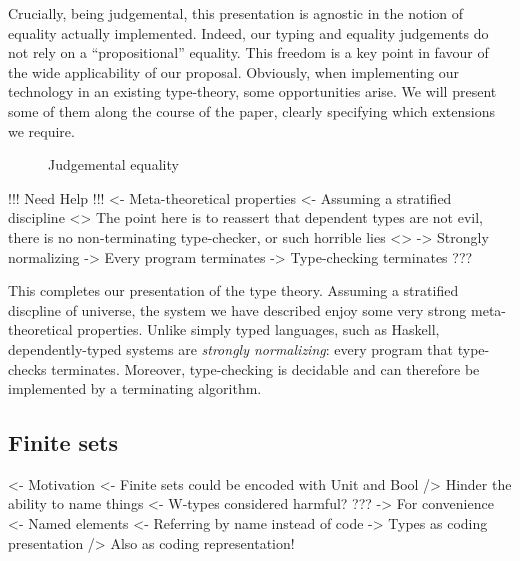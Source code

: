 Crucially, being judgemental, this presentation is agnostic in the
notion of equality actually implemented. Indeed, our typing and
equality judgements do not rely on a ``propositional'' equality. This
freedom is a key point in favour of the wide applicability of our
proposal. Obviously, when implementing our technology in an existing
type-theory, some opportunities arise. We will present some of them
along the course of the paper, clearly specifying which extensions we
require.

\begin{figure}



\caption{Judgemental equality}
\label{fig:judgemental-equality}

\end{figure}



\begin{wstructure}
!!! Need Help !!!
<- Meta-theoretical properties
    <- Assuming a stratified discipline
    <> The point here is to reassert that dependent types are not evil, 
       there is no non-terminating type-checker, or such horrible lies <>
    -> Strongly normalizing
        -> Every program terminates
    -> Type-checking terminates
    ???
\end{wstructure}

This completes our presentation of the type theory. Assuming a
stratified discpline of universe, the system we have described enjoy
some very strong meta-theoretical properties. Unlike simply typed
languages, such as Haskell, dependently-typed systems are
\emph{strongly normalizing}: every program that type-checks
terminates. Moreover, type-checking is decidable and can therefore be
implemented by a terminating algorithm.


\subsection{Finite sets}
\label{sec:finite-sets}

\begin{wstructure}
<- Motivation
    <- Finite sets could be encoded with Unit and Bool
        /> Hinder the ability to name things
    <- W-types considered harmful?
        ???
    -> For convenience
        <- Named elements
        <- Referring by name instead of code
        -> Types as coding presentation
            /> Also as coding representation!
\end{wstructure}

